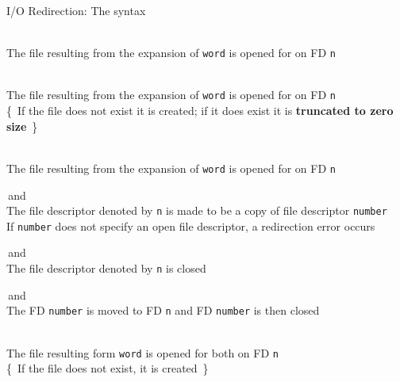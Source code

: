 \begin{frame}{I/O Redirection: The syntax}
    \vspace{-3mm}
    \begin{description}
        \item[Redirecting Input:] \\
            {\small
                The file resulting from the expansion of \texttt{word} is opened for  on FD \texttt{n}
            }
        \item[Redirecting Output:] \\
            {\small
                The file resulting from the expansion of \texttt{word} is opened for  on FD \texttt{n}\\[-0.5em]
                {\tiny\{~If the file does not exist it is created; if it does exist it is \textbf{truncated to zero size}~\}}
            }
        \item[Appending Output:] \\
            {\small
                The file resulting from the expansion of \texttt{word} is opened for  on FD \texttt{n}
            }
        \item[Duplicating FDs:]  \,and\, \\
            {\small
                The file descriptor denoted by \texttt{n} is made to be a copy of file descriptor \texttt{number}\\
                If \texttt{number} does not specify an open file descriptor, a redirection error occurs
            }
        \item[Closing FDs:] \PB{\small\texttt{[n]<\&-}} \,and\, \PB{\small\texttt{[n]>\&-}}\\
            {\small
                The file descriptor denoted by \texttt{n} is closed
            }
        \item[Moving FDs:]  \,and\, \\
            {\small
                The FD \texttt{number} is moved to FD \texttt{n} and FD \texttt{number} is then closed
            }
        \item[I/O FDs:] \\
            {\small
                The file resulting form \texttt{word} is opened for both  on FD \texttt{n}\\[-0.5em]
                {\tiny\{~If the file does not exist, it is created~\}}
            }
    \end{description}
\end{frame}
